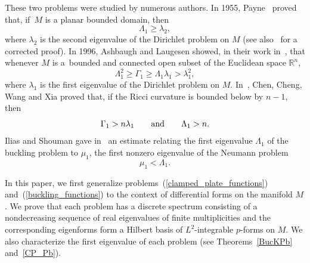 \documentclass[pdftex]{sigma}
\newcommand{\R}{{\mathbb R}}
\numberwithin{equation}{section}
\theoremstyle{definition}
\begin{document}
These two problems were studied by numerous authors.
In 1955, Payne~\cite{Payne1955} proved that, if~$M$ is a planar bounded domain, then
\begin{equation*}
\Lambda_1 \ge \lambda_2,
\end{equation*}
where $\lambda_2$ is the second eigenvalue of the Dirichlet problem on $M$ (see also~\cite{Friedlander2004} for a corrected proof).
In 1996, Ashbaugh and Laugesen showed, in their work in~\cite{AL}, that whenever $M$ is a~bounded and connected open subset of the Euclidean space $\R^n$,
\begin{equation}
\label{AL} \Lambda_1^2 \ge \Gamma_1 \ge \Lambda_1 \lambda_1 > \lambda_1^2,
\end{equation}
where $\lambda_1$ is the first eigenvalue of the Dirichlet problem on $M$.
 In~\cite{ChenChengWangXia2012}, Chen, Cheng, Wang and Xia proved that, if the Ricci curvature is bounded below by $n-1$, then
\begin{equation*}%
\Gamma_1 > n\lambda_1\qquad\hbox{and}\qquad \Lambda_1>n.
\end{equation*}
Ilias and Shouman gave in~\cite{IliasShouman2019} an estimate relating the first eigenvalue $\Lambda_1$ of the buckling problem to $\mu_1$, the first nonzero eigenvalue of the Neumann problem
 \begin{equation} \label{IS}
 \mu_1 < \Lambda_1.
 \end{equation}

In this paper, we first generalize problems~(\ref{clamped_plate_functions}) and~(\ref{buckling_functions}) to the context of differential forms on the manifold $M$.
We prove that each problem has a discrete spectrum consisting of a nondecreasing sequence of real eigenvalues of finite multiplicities and the corresponding eigenforms form a Hilbert basis of $L^2$-integrable $p$-forms on $M$.
We also characterize the first eigenvalue of each problem (see Theorems~\ref{BucKPb} and~\ref{CP_Pb}).
\end{document}
